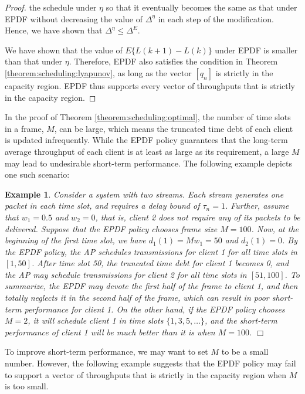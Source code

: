\documentclass[10pt,nocopyrightspace]{sigplan-proc-varsize-1in}
\newtheorem{example}{Example}
\begin{document}
\begin{proof}
the schedule under $\eta$ so that it eventually becomes the same as that under EPDF without decreasing the value of $\Delta^\eta$ in each step of the modification. Hence, we have shown that $\Delta^\eta\leq\Delta^E$.

We have shown that the value of $E\{L(k+1)-L(k)\}$ under EPDF is smaller than that under $\eta$. Therefore, EPDF also satisfies the condition in Theorem \ref{theorem:scheduling:lyapunov}, as long as the vector $[q_n]$ is strictly in the capacity region. EPDF thus supports every vector of throughputs that is strictly in the capacity region.
\end{proof}

In the proof of Theorem \ref{theorem:scheduling:optimal}, the number of time slots in a frame, $M$, can be large, which means the truncated time debt of each client is updated infrequently. While the EPDF policy guarantees that the long-term average throughput of each client is at least as large as its requirement, a large $M$ may lead to undesirable short-term performance. The following example depicts one such scenario:

\begin{example}
Consider a system with two streams. Each stream generates one packet in each time slot, and requires a delay bound of $\tau_n=1$. Further, assume that $w_1=0.5$ and $w_2=0$, that is, client 2 does not require any of its packets to be delivered. Suppose that the EPDF policy chooses frame size $M=100$. Now, at the beginning of the first time slot, we have $d_1(1)=Mw_1=50$ and $d_2(1)=0$. By the EPDF policy, the AP schedules transmissions for client 1 for all time slots in $[1,50]$. After time slot 50, the truncated time debt for client 1 becomes 0, and the AP may schedule transmissions for client 2 for all time slots in $[51,100]$. To summarize, the EPDF may devote the first half of the frame to client 1, and then totally neglects it in the second half of the frame, which can result in poor short-term performance for client 1. On the other hand, if the EPDF policy chooses $M=2$, it will schedule client 1 in time slots $\{1,3,5,\dots\}$, and the short-term performance of client 1 will be much better than it is when $M=100$. $\Box$
\end{example}

To improve short-term performance, we may want to set $M$ to be a small number. However, the following example suggests that the EPDF policy may fail to support a vector of throughputs that is strictly in the capacity region when $M$ is too small.
\end{document}
